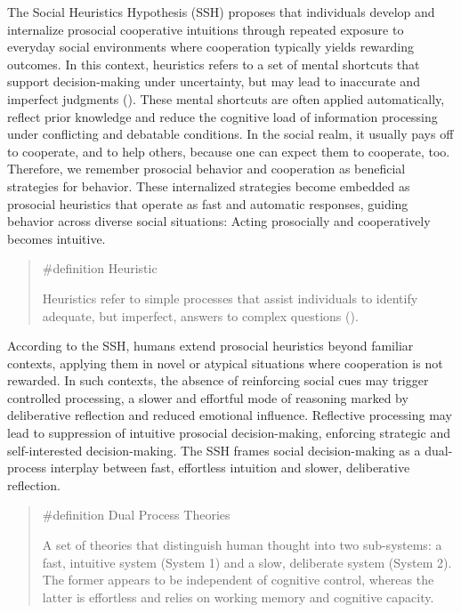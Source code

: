 \documentclass[
  letterpaper,
]{book}
\begin{document}
The Social Heuristics Hypothesis (SSH) proposes that individuals develop
and internalize prosocial cooperative intuitions through repeated
exposure to everyday social environments where cooperation typically
yields rewarding outcomes. In this context, heuristics refers to a set
of mental shortcuts that support decision-making under uncertainty, but
may lead to inaccurate and imperfect judgments
(). These mental
shortcuts are often applied automatically, reflect prior knowledge and
reduce the cognitive load of information processing under conflicting
and debatable conditions. In the social realm, it usually pays off to
cooperate, and to help others, because one can expect them to cooperate,
too. Therefore, we remember prosocial behavior and cooperation as
beneficial strategies for behavior. These internalized strategies become
embedded as prosocial heuristics that operate as fast and automatic
responses, guiding behavior across diverse social situations: Acting
prosocially and cooperatively becomes intuitive.

\begin{quote}
\label{def-heuristic}{\#definition} Heuristic

Heuristics refer to simple processes that assist individuals to identify
adequate, but imperfect, answers to complex questions
().
\end{quote}

According to the SSH, humans extend prosocial heuristics beyond familiar
contexts, applying them in novel or atypical situations where
cooperation is not rewarded. In such contexts, the absence of
reinforcing social cues may trigger controlled processing, a slower and
effortful mode of reasoning marked by deliberative reflection and
reduced emotional influence. Reflective processing may lead to
suppression of intuitive prosocial decision-making, enforcing strategic
and self-interested decision-making. The SSH frames social
decision-making as a dual-process interplay between fast, effortless
intuition and slower, deliberative reflection.

\begin{quote}
\label{def-dualprocess}{\#definition} Dual Process
Theories

A set of theories that distinguish human thought into two sub-systems: a
fast, intuitive system (System 1) and a slow, deliberate system (System
2). The former appears to be independent of cognitive control, whereas
the latter is effortless and relies on working memory and cognitive
capacity.
\end{quote}
\end{document}
